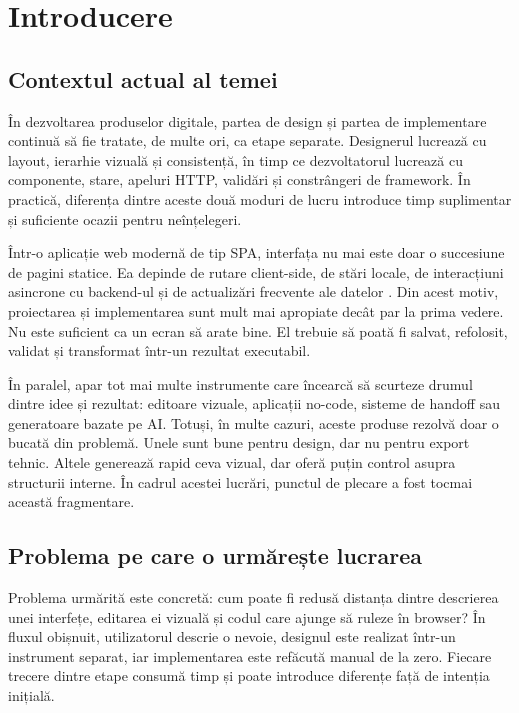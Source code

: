 \chapter{Introducere}

\section{Contextul actual al temei}

În dezvoltarea produselor digitale, partea de design și partea de implementare continuă să fie tratate, de multe ori, ca etape separate. Designerul lucrează cu layout, ierarhie vizuală și consistență, în timp ce dezvoltatorul lucrează cu componente, stare, apeluri HTTP, validări și constrângeri de framework. În practică, diferența dintre aceste două moduri de lucru introduce timp suplimentar și suficiente ocazii pentru neînțelegeri.

Într-o aplicație web modernă de tip SPA, interfața nu mai este doar o succesiune de pagini statice. Ea depinde de rutare client-side, de stări locale, de interacțiuni asincrone cu backend-ul și de actualizări frecvente ale datelor \cite{angularDocs2026}. Din acest motiv, proiectarea și implementarea sunt mult mai apropiate decât par la prima vedere. Nu este suficient ca un ecran să arate bine. El trebuie să poată fi salvat, refolosit, validat și transformat într-un rezultat executabil.

În paralel, apar tot mai multe instrumente care încearcă să scurteze drumul dintre idee și rezultat: editoare vizuale, aplicații no-code, sisteme de handoff sau generatoare bazate pe AI. Totuși, în multe cazuri, aceste produse rezolvă doar o bucată din problemă. Unele sunt bune pentru design, dar nu pentru export tehnic. Altele generează rapid ceva vizual, dar oferă puțin control asupra structurii interne. În cadrul acestei lucrări, punctul de plecare a fost tocmai această fragmentare.

\section{Problema pe care o urmărește lucrarea}

Problema urmărită este concretă: cum poate fi redusă distanța dintre descrierea unei interfețe, editarea ei vizuală și codul care ajunge să ruleze în browser? În fluxul obișnuit, utilizatorul descrie o nevoie, designul este realizat într-un instrument separat, iar implementarea este refăcută manual de la zero. Fiecare trecere dintre etape consumă timp și poate introduce diferențe față de intenția inițială.

